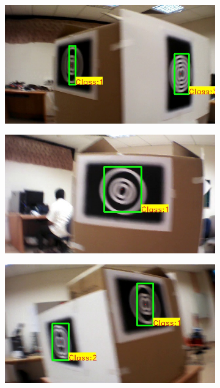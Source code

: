 \documentclass[10pt,twocolumn,letterpaper]{article}
\begin{document}
\begin{figure}
\begin{subfigure}[b]{.19\textwidth}
\includegraphics[width=\linewidth]{setup_our/output_6/output_514.jpg}
\end{subfigure}
\begin{subfigure}[b]{.19\textwidth}
\includegraphics[width=\linewidth]{setup_our/output_6/output_556.jpg}
\end{subfigure}
\begin{subfigure}[b]{.19\textwidth}
\includegraphics[width=\linewidth]{setup_our/output_2/output_35.jpg}

\end{subfigure}
\end{figure}
\end{document}
